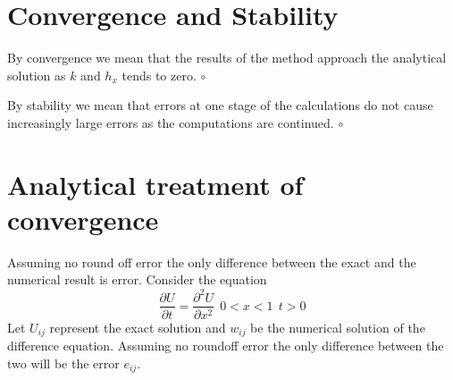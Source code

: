 \section{Convergence and Stability}
\begin{definition}
By convergence we mean that the results of the method approach the analytical solution as $k$ and $h_x$ tends to zero.
$\circ$
\end{definition}
\begin{definition}
By stability we mean that errors at one stage of the calculations do not cause
increasingly large errors as  the computations are continued.
$\circ$
\end{definition}
\section{Analytical treatment of convergence}
Assuming no round off error the only difference between the exact and the numerical result is error.
Consider the equation
\[ \frac{\partial U}{\partial t} = \frac{\partial^2 U}{\partial x^2} \ \ 0 < x <1 \ \ t>0 \]
Let $U_{ij}$ represent the exact solution and $w_{ij}$ be the numerical solution of the difference equation.  Assuming no roundoff error the only difference between the two will be the error $e_{ij}$.
